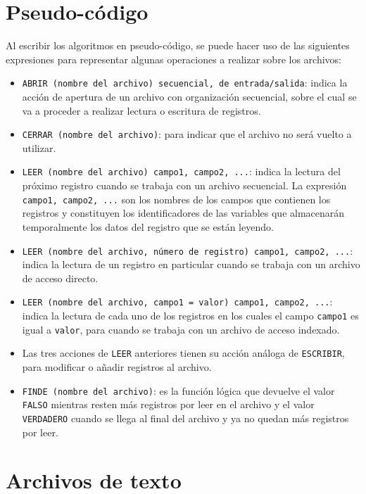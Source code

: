 \documentclass[]{book}
\providecommand{\tightlist}{%
  \setlength{\itemsep}{0pt}\setlength{\parskip}{0pt}}
\begin{document}
\section{Pseudo-código}\label{pseudo-codigo}

Al escribir los algoritmos en pseudo-código, se puede hacer uso de las
siguientes expresiones para representar algunas operaciones a realizar
sobre los archivos:

\begin{itemize}
\tightlist
\item
  \texttt{ABRIR\ (nombre\ del\ archivo)\ secuencial,\ de\ entrada/salida}:
  indica la acción de apertura de un archivo con organización
  secuencial, sobre el cual se va a proceder a realizar lectura o
  escritura de registros.
\item
  \texttt{CERRAR\ (nombre\ del\ archivo)}: para indicar que el archivo
  no será vuelto a utilizar.
\item
  \texttt{LEER\ (nombre\ del\ archivo)\ campo1,\ campo2,\ ...}: indica
  la lectura del próximo registro cuando se trabaja con un archivo
  secuencial. La expresión \texttt{campo1,\ campo2,\ ...} son los
  nombres de los campos que contienen los registros y constituyen los
  identificadores de las variables que almacenarán temporalmente los
  datos del registro que se están leyendo.
\item
  \texttt{LEER\ (nombre\ del\ archivo,\ número\ de\ registro)\ campo1,\ campo2,\ ...}:
  indica la lectura de un registro en particular cuando se trabaja con
  un archivo de acceso directo.
\item
  \texttt{LEER\ (nombre\ del\ archivo,\ campo1\ =\ valor)\ campo1,\ campo2,\ ...}:
  indica la lectura de cada uno de los registros en los cuales el campo
  \texttt{campo1} es igual a \texttt{valor}, para cuando se trabaja con
  un archivo de acceso indexado.
\item
  Las tres acciones de \texttt{LEER} anteriores tienen su acción análoga
  de \texttt{ESCRIBIR}, para modificar o añadir registros al archivo.
\item
  \texttt{FINDE\ (nombre\ del\ archivo)}: es la función lógica que
  devuelve el valor \texttt{FALSO} mientras resten más registros por
  leer en el archivo y el valor \texttt{VERDADERO} cuando se llega al
  final del archivo y ya no quedan más registros por leer.
\end{itemize}

\section{Archivos de texto}\label{archivos-de-texto}
\end{document}
